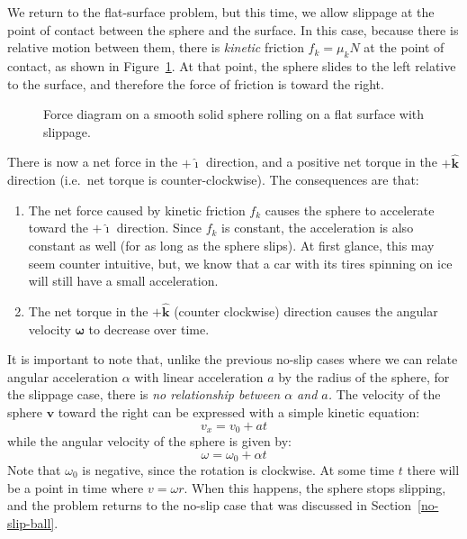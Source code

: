 \documentclass{../../../oss-handout}
\newcommand{\iii}{\hat{\bm{\imath}}}
\newcommand{\kkk}{\hat{\bm{k}}}
\begin{document}
We return to the flat-surface problem, but this time, we allow slippage at the
point of contact between the sphere and the surface. In this case, because there
is relative motion between them, there is \emph{kinetic} friction $f_k=\mu_kN$
at the point of contact, as shown in Figure~\ref{slip1}. At that point, the
sphere slides to the left relative to the surface, and therefore the force of
friction is toward the right.
\begin{figure}[!ht]
  \centering
  \caption{Force diagram on a smooth solid sphere rolling on a flat surface with
    slippage.}
  \label{slip1}
\end{figure}

There is now a net force in the $+\iii$ direction, and a positive net torque in
the $+\kkk$ direction (i.e.\ net torque is counter-clockwise). The consequences
are that:
\begin{enumerate}[topsep=0pt]
\item The net force caused by kinetic friction $f_k$ causes the sphere to
  accelerate toward the $+\iii$ direction. Since $f_k$ is constant, the
  acceleration is also constant as well (for as long as the sphere slips). At
  first glance, this may seem counter intuitive, but, we know that a car with
  its tires spinning on ice will still have a small acceleration.
\item The net torque in the $+\kkk$ (counter clockwise) direction
  causes the angular velocity $\bm{\omega}$ to decrease over time.
\end{enumerate}
It is important to note that, unlike the previous no-slip cases where we can 
relate angular acceleration $\alpha$ with linear acceleration $a$ by the radius
of the sphere, for the slippage case, there is \emph{no relationship between
  $\alpha$ and $a$.} The velocity of the sphere $\bm{v}$ toward the right can
be expressed with a simple kinetic equation:
\begin{equation}
  v_x=v_0+at
\end{equation}
while the angular velocity of the sphere is given by:
\begin{equation}
  \omega=\omega_0+\alpha t
\end{equation}
Note that $\omega_0$ is negative, since the rotation is clockwise. At some time
$t$ there will be a point in time where $v=\omega r$. When this happens, the
sphere stops slipping, and the problem returns to the no-slip case that was
discussed in Section~\ref{no-slip-ball}.
\end{document}
